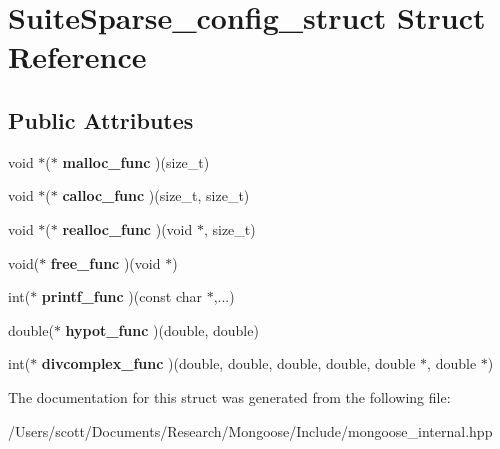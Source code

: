 \hypertarget{struct_suite_sparse__config__struct}{}\section{Suite\+Sparse\+\_\+config\+\_\+struct Struct Reference}
\label{struct_suite_sparse__config__struct}
\subsection*{Public Attributes}
\begin{DoxyCompactItemize}
\item 
void $\ast$($\ast$ {\bfseries malloc\+\_\+func} )(size\+\_\+t)\hypertarget{struct_suite_sparse__config__struct_a238c6b172954fd01a656eb2788aaf75e}{}\label{struct_suite_sparse__config__struct_a238c6b172954fd01a656eb2788aaf75e}

\item 
void $\ast$($\ast$ {\bfseries calloc\+\_\+func} )(size\+\_\+t, size\+\_\+t)\hypertarget{struct_suite_sparse__config__struct_aa8e6d76b213142535b606b0d8a4ef314}{}\label{struct_suite_sparse__config__struct_aa8e6d76b213142535b606b0d8a4ef314}

\item 
void $\ast$($\ast$ {\bfseries realloc\+\_\+func} )(void $\ast$, size\+\_\+t)\hypertarget{struct_suite_sparse__config__struct_ae4a00ab09e0c57cc0dbb71d29653d355}{}\label{struct_suite_sparse__config__struct_ae4a00ab09e0c57cc0dbb71d29653d355}

\item 
void($\ast$ {\bfseries free\+\_\+func} )(void $\ast$)\hypertarget{struct_suite_sparse__config__struct_a1c63928f26bce192b95906a4dd89561f}{}\label{struct_suite_sparse__config__struct_a1c63928f26bce192b95906a4dd89561f}

\item 
int($\ast$ {\bfseries printf\+\_\+func} )(const char $\ast$,...)\hypertarget{struct_suite_sparse__config__struct_af36508c39c2294f3d2da1a6c9454bb19}{}\label{struct_suite_sparse__config__struct_af36508c39c2294f3d2da1a6c9454bb19}

\item 
double($\ast$ {\bfseries hypot\+\_\+func} )(double, double)\hypertarget{struct_suite_sparse__config__struct_acc22938ee31d055f9a9a63d346947f2c}{}\label{struct_suite_sparse__config__struct_acc22938ee31d055f9a9a63d346947f2c}

\item 
int($\ast$ {\bfseries divcomplex\+\_\+func} )(double, double, double, double, double $\ast$, double $\ast$)\hypertarget{struct_suite_sparse__config__struct_af8075d497f64f40d4bb4274a19f9775d}{}\label{struct_suite_sparse__config__struct_af8075d497f64f40d4bb4274a19f9775d}

\end{DoxyCompactItemize}


The documentation for this struct was generated from the following file\+:\begin{DoxyCompactItemize}
\item 
/\+Users/scott/\+Documents/\+Research/\+Mongoose/\+Include/mongoose\+\_\+internal.\+hpp\end{DoxyCompactItemize}

